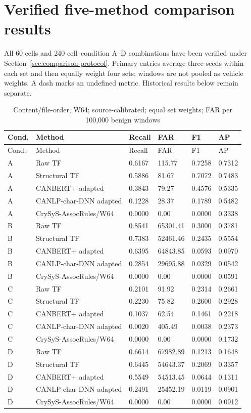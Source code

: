 \documentclass[12pt,a4paper,oneside,openany]{extbook}
\begin{document}
\section{Verified five-method comparison results}\label{sec:comparison-results}
All 60 cells and 240 cell--condition A--D combinations have been verified under Section~\ref{sec:comparison-protocol}. Primary entries average three seeds within each set and then equally weight four sets; windows are not pooled as vehicle weights. A dash marks an undefined metric. Historical results below remain separate.
\begin{longtable}{P{1.2cm}P{4.0cm}P{1.7cm}P{2.2cm}P{1.7cm}P{1.7cm}}
\caption{Content/file-order, W64; source-calibrated; equal set weights; FAR per 100,000 benign windows}\label{tab:comparison-main}\\\toprule
Cond. & Method & Recall & FAR & F1 & AP\\\midrule\endfirsthead
\toprule
Cond. & Method & Recall & FAR & F1 & AP\\\midrule\endhead
A & Raw TF & 0.6167 & 115.77 & 0.7258 & 0.7312\\
A & Structural TF & 0.5886 & 81.67 & 0.7072 & 0.7483\\
A & CANBERT+ adapted & 0.3843 & 79.27 & 0.4576 & 0.5335\\
A & CANLP-char-DNN adapted & 0.1228 & 28.37 & 0.1789 & 0.5482\\
A & CrySyS-AssocRules/W64 & 0.0000 & 0.00 & 0.0000 & 0.3338\\
B & Raw TF & 0.8541 & 65301.41 & 0.3000 & 0.3781\\
B & Structural TF & 0.7383 & 52461.46 & 0.2435 & 0.5554\\
B & CANBERT+ adapted & 0.6395 & 64843.85 & 0.0593 & 0.0970\\
B & CANLP-char-DNN adapted & 0.2854 & 29695.88 & 0.0329 & 0.0542\\
B & CrySyS-AssocRules/W64 & 0.0000 & 0.00 & 0.0000 & 0.0591\\
C & Raw TF & 0.2101 & 91.92 & 0.2314 & 0.2661\\
C & Structural TF & 0.2230 & 75.82 & 0.2600 & 0.2928\\
C & CANBERT+ adapted & 0.1037 & 62.54 & 0.1461 & 0.2218\\
C & CANLP-char-DNN adapted & 0.0020 & 405.49 & 0.0038 & 0.2373\\
C & CrySyS-AssocRules/W64 & 0.0000 & 0.00 & 0.0000 & 0.1732\\
D & Raw TF & 0.6614 & 67982.89 & 0.1213 & 0.1648\\
D & Structural TF & 0.6445 & 54643.37 & 0.2069 & 0.3357\\
D & CANBERT+ adapted & 0.5549 & 54513.45 & 0.0644 & 0.1311\\
D & CANLP-char-DNN adapted & 0.2491 & 25452.19 & 0.0119 & 0.0901\\
D & CrySyS-AssocRules/W64 & 0.0000 & 0.00 & 0.0000 & 0.0912\\
\bottomrule\end{longtable}
\end{document}
